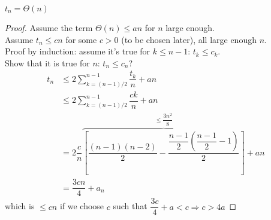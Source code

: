 \begin{theorem}
$t_n=\Theta (n)$
\end{theorem}
\begin{proof}
Assume the term $\Theta (n)\leq an$ for $n$ large enough.\\
Assume $t_n\leq cn$ for some $c>0$ (to be chosen later), all large enough $n$.\\
Proof by induction: assume it's true for $k\leq n-1$: $t_k\leq c_k$.\\
Show that it is true for $n$: $t_n\leq c_n$?
\begin{align*}
t_n &\leq 2\sum\limits_{k=(n-1)/2}^{n-1}\dfrac{t_k}{n}+an\\
&\leq 2\sum\limits_{k=(n-1)/2}^{n-1}\dfrac{ck}{n}+an\\
&=2\dfrac{c}{n}\overbrace{\left[\dfrac{(n-1)(n-2)}{2}-\dfrac{\dfrac{n-1}{2}\left(\dfrac{n-1}{2}-1\right)}{2}\right]}\limits^{\leq \dfrac{3n^2}{8}}+an\\
&=\dfrac{3cn}{4}+a_n
\end{align*}
which is $\leq cn$ if we choose $c$ such that $\dfrac{3c}{4}+a<c \Rightarrow c>4a$
\end{proof}